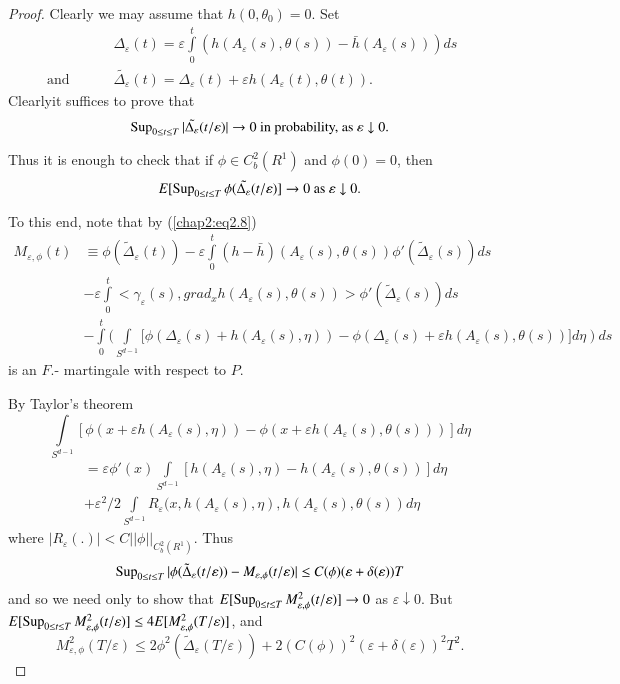 \begin{proof}
Clearly we may assume that $h(0 , \theta_0) = 0$. Set
\begin{align*}
& \Delta_\varepsilon (t) = \varepsilon \int\limits^t_0 (h(A_\varepsilon
(s), \theta(s)) - \bar{h}(A_\varepsilon(s)))ds \\
\text{and } \qquad & \tilde{\Delta_\varepsilon}(t) = \Delta_\varepsilon(t) +
\varepsilon h(A_\varepsilon(t), \theta(t)).  \hspace{3cm}
\end{align*}
Clearly\pageoriginale it suffices to prove that
$$
\operatorname{Sup}_{0 \le t \le T} |\tilde{\Delta_\varepsilon} (t / \varepsilon)|
\rightarrow 0 \text { in probability, as } \varepsilon \downarrow 0. 
$$

Thus it is enough to check that if $\phi \in C^2_b (R^1)$ and
$\phi(0) = 0$, then  
$$
E[ \operatorname{Sup}_{0 \le t \le T} \phi (\tilde{\Delta_\varepsilon}(t/
  \varepsilon) ] \rightarrow 0 \text{ as } \varepsilon \downarrow 0. 
$$

To this end, note that by (\ref{chap2:eq2.8})
{\fontsize{10pt}{12pt}\selectfont
\begin{align*}
M_{\varepsilon,\phi} (t) & \equiv \phi (\tilde{\Delta}_\varepsilon(t)) -
\varepsilon \int \limits ^t_0 (h - \bar{h}) (A_\varepsilon(s),
\theta(s)) \phi ' (\tilde{\Delta}_\varepsilon(s)) ds \\ 
& - \varepsilon \int \limits ^t_0 < \gamma_\varepsilon (s), grad_x
h(A_\varepsilon(s), \theta(s)) > \phi'(\tilde{\Delta}_\varepsilon(s)) ds
\\ 
& - \int\limits^t_0 (\int\limits_{S^{d-1}}[\phi (\Delta_\varepsilon(s) + h
  (A_\varepsilon (s), \eta)) - \phi (\Delta_\varepsilon (s) +
  \varepsilon h (A_\varepsilon (s), \theta(s))] d\eta) ds 
\end{align*}}\relax
is an $F$.- martingale with respect to $P$.

By Taylor's theorem
$$
\int \limits _{S^{d-1}} [ \phi (x + \varepsilon h (A_\varepsilon(s),
  \eta)) -  \phi (x + \varepsilon h (A_\varepsilon(s), \theta(s))) ] d
\eta 
$$
\begin{align*}
& = \varepsilon \phi '(x) \int \limits _{S^{d-1}} [h
    (A_\varepsilon(s), \eta)-h(A_{\varepsilon} (s), \theta (s))] d \eta \\ 
& + \varepsilon^2 /2 \int \limits _{S^{d-1}} R_\varepsilon (x,  h
  (A_\varepsilon(s), \eta),  h (A_\varepsilon(s) , \theta(s)) d\eta 
\end{align*}
where $|R_\varepsilon (.)| < C || \phi || _{C^2_b (R^1)}$. Thus 
$$
\operatorname{Sup}_{0 \le t \le T} | \phi (\tilde{\Delta}_\varepsilon
(t/\varepsilon)) - M_{\varepsilon , \phi}(t/\varepsilon) | \le
C(\phi)(\varepsilon + \delta(\varepsilon))T 
$$
and so we need only to show that $E[ \operatorname{Sup}\limits_{0 \le t \le T}
  M^2_{\varepsilon , \phi}(t / \varepsilon)] \rightarrow 0$ as
$\varepsilon \downarrow 0$. But $E[ \operatorname{Sup}\limits_{0 \le t \le T}
  M^2_{\varepsilon , \phi}(t / \varepsilon)] \le 4 E[M^2_{\varepsilon
    , \phi}(T/\varepsilon)]$, and
$$
M^2_{\varepsilon ,  \phi}(T/\varepsilon) \leq 2 \phi^2
(\tilde{\Delta}_\varepsilon (T/\varepsilon)) + 2(C(\phi))^2
(\varepsilon + \delta(\varepsilon))^2 T^2.
$$\pageoriginale 


\end{proof}
